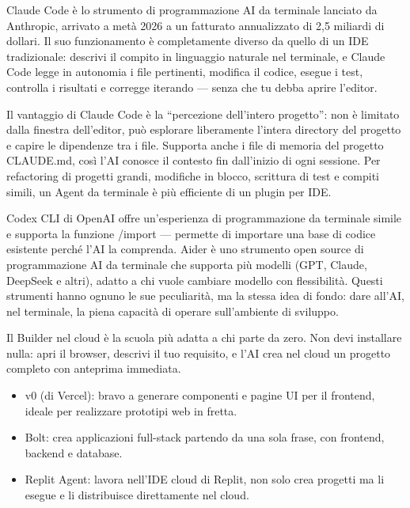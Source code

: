 
Claude Code è lo strumento di programmazione AI da terminale lanciato da Anthropic, arrivato a metà 2026 a un fatturato annualizzato di 2,5 miliardi di dollari. Il suo funzionamento è completamente diverso da quello di un IDE tradizionale: descrivi il compito in linguaggio naturale nel terminale, e Claude Code legge in autonomia i file pertinenti, modifica il codice, esegue i test, controlla i risultati e corregge iterando — senza che tu debba aprire l'editor.

Il vantaggio di Claude Code è la “percezione dell'intero progetto”: non è limitato dalla finestra dell'editor, può esplorare liberamente l'intera directory del progetto e capire le dipendenze tra i file. Supporta anche i file di memoria del progetto CLAUDE.md, così l'AI conosce il contesto fin dall'inizio di ogni sessione. Per refactoring di progetti grandi, modifiche in blocco, scrittura di test e compiti simili, un Agent da terminale è più efficiente di un plugin per IDE.


Codex CLI di OpenAI offre un'esperienza di programmazione da terminale simile e supporta la funzione /import — permette di importare una base di codice esistente perché l'AI la comprenda. Aider è uno strumento open source di programmazione AI da terminale che supporta più modelli (GPT, Claude, DeepSeek e altri), adatto a chi vuole cambiare modello con flessibilità. Questi strumenti hanno ognuno le sue peculiarità, ma la stessa idea di fondo: dare all'AI, nel terminale, la piena capacità di operare sull'ambiente di sviluppo.


Il Builder nel cloud è la scuola più adatta a chi parte da zero. Non devi installare nulla: apri il browser, descrivi il tuo requisito, e l'AI crea nel cloud un progetto completo con anteprima immediata.

\begin{itemize}
  \item v0 (di Vercel): bravo a generare componenti e pagine UI per il frontend, ideale per realizzare prototipi web in fretta.
  \item Bolt: crea applicazioni full-stack partendo da una sola frase, con frontend, backend e database.
  \item Replit Agent: lavora nell'IDE cloud di Replit, non solo crea progetti ma li esegue e li distribuisce direttamente nel cloud.
\end{itemize}

